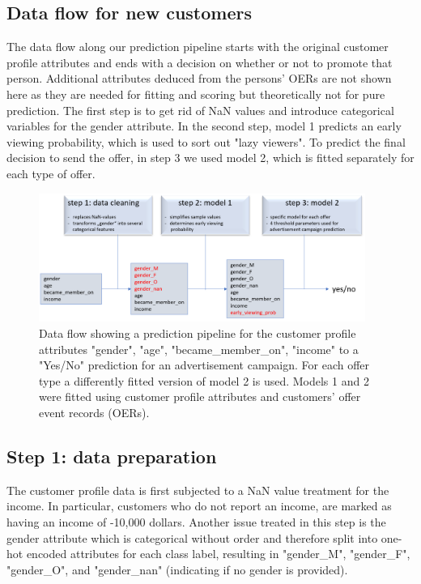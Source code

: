 \documentclass[11pt]{article} %
\begin{document}
\subsection{Data flow for new customers}
The data flow along our prediction pipeline starts with the original customer profile attributes and ends with a decision on whether or not to promote that person. 
Additional attributes deduced from the persons' OERs are not shown here as they are needed for fitting and scoring but theoretically not for pure prediction.
The first step is to get rid of NaN values and introduce categorical variables for the gender attribute. In the second step, model 1 predicts an early viewing probability, which is used to sort out "lazy viewers".  To predict the final decision to send the offer, in step 3 we used model 2, which is fitted separately for each type of offer.
\begin{figure}[H]
\includegraphics[width=0.95\textwidth]{pics/dataflow.png}
\caption{Data flow showing a prediction  pipeline for the customer profile attributes  "gender", "age", "became\_member\_on", "income" to a "Yes/No" prediction for an advertisement campaign. For each offer type a differently fitted version of model 2 is used. Models 1 and 2 were fitted using customer profile attributes and customers' offer event records (OERs).}
\end{figure}

\subsection{\label{model step 1}Step 1: data preparation}
The customer profile data is first subjected to a NaN value treatment for the income.
In particular, customers who do not report an income, are marked as having an income of -10,000 dollars.
Another issue treated in this step is the gender attribute which is categorical without order and therefore split into one-hot encoded attributes for each class label, resulting in "gender\_M", "gender\_F", "gender\_O",  and "gender\_nan" (indicating if no gender is provided).
\end{document}
